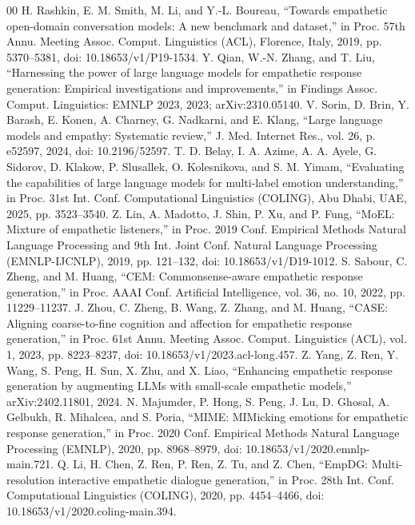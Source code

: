 \documentclass[conference,a4paper]{IEEEtran}
\begin{document}
\begin{thebibliography}{00}
 H. Rashkin, E. M. Smith, M. Li, and Y.-L. Boureau, ``Towards empathetic open-domain conversation models: A new benchmark and dataset,'' in Proc. 57th Annu. Meeting Assoc. Comput. Linguistics (ACL), Florence, Italy, 2019, pp. 5370--5381, doi: 10.18653/v1/P19-1534.
 Y. Qian, W.-N. Zhang, and T. Liu, ``Harnessing the power of large language models for empathetic response generation: Empirical investigations and improvements,'' in Findings Assoc. Comput. Linguistics: EMNLP 2023, 2023; arXiv:2310.05140.
 V. Sorin, D. Brin, Y. Barash, E. Konen, A. Charney, G. Nadkarni, and E. Klang, ``Large language models and empathy: Systematic review,'' J. Med. Internet Res., vol. 26, p. e52597, 2024, doi: 10.2196/52597.
 T. D. Belay, I. A. Azime, A. A. Ayele, G. Sidorov, D. Klakow, P. Slusallek, O. Kolesnikova, and S. M. Yimam, ``Evaluating the capabilities of large language models for multi-label emotion understanding,'' in Proc. 31st Int. Conf. Computational Linguistics (COLING), Abu Dhabi, UAE, 2025, pp. 3523--3540.
 Z. Lin, A. Madotto, J. Shin, P. Xu, and P. Fung, ``MoEL: Mixture of empathetic listeners,'' in Proc. 2019 Conf. Empirical Methods Natural Language Processing and 9th Int. Joint Conf. Natural Language Processing (EMNLP-IJCNLP), 2019, pp. 121--132, doi: 10.18653/v1/D19-1012.
 S. Sabour, C. Zheng, and M. Huang, ``CEM: Commonsense-aware empathetic response generation,'' in Proc. AAAI Conf. Artificial Intelligence, vol. 36, no. 10, 2022, pp. 11229--11237.
 J. Zhou, C. Zheng, B. Wang, Z. Zhang, and M. Huang, ``CASE: Aligning coarse-to-fine cognition and affection for empathetic response generation,'' in Proc. 61st Annu. Meeting Assoc. Comput. Linguistics (ACL), vol. 1, 2023, pp. 8223--8237, doi: 10.18653/v1/2023.acl-long.457.
 Z. Yang, Z. Ren, Y. Wang, S. Peng, H. Sun, X. Zhu, and X. Liao, ``Enhancing empathetic response generation by augmenting LLMs with small-scale empathetic models,'' arXiv:2402.11801, 2024.
 N. Majumder, P. Hong, S. Peng, J. Lu, D. Ghosal, A. Gelbukh, R. Mihalcea, and S. Poria, ``MIME: MIMicking emotions for empathetic response generation,'' in Proc. 2020 Conf. Empirical Methods Natural Language Processing (EMNLP), 2020, pp. 8968--8979, doi: 10.18653/v1/2020.emnlp-main.721.
 Q. Li, H. Chen, Z. Ren, P. Ren, Z. Tu, and Z. Chen, ``EmpDG: Multi-resolution interactive empathetic dialogue generation,'' in Proc. 28th Int. Conf. Computational Linguistics (COLING), 2020, pp. 4454--4466, doi: 10.18653/v1/2020.coling-main.394.

\end{thebibliography}
\end{document}
